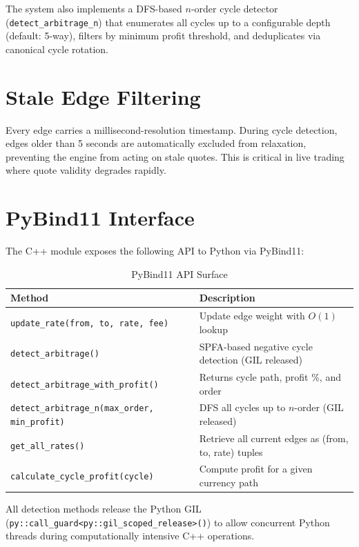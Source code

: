 \documentclass[letterpaper,11pt]{report}
\begin{document}
The system also implements a DFS-based $n$-order cycle detector (\texttt{detect\_arbitrage\_n}) that enumerates all cycles up to a configurable depth (default: 5-way), filters by minimum profit threshold, and deduplicates via canonical cycle rotation.

\section{Stale Edge Filtering}

Every edge carries a millisecond-resolution timestamp. During cycle detection, edges older than 5 seconds are automatically excluded from relaxation, preventing the engine from acting on stale quotes. This is critical in live trading where quote validity degrades rapidly.

\section{PyBind11 Interface}

The C++ module exposes the following API to Python via PyBind11:

\begin{table}[h]
\centering
\caption{PyBind11 API Surface}
\begin{tabular}{lp{7.5cm}}
\toprule
\textbf{Method} & \textbf{Description} \\
\midrule
\texttt{update\_rate(from, to, rate, fee)} & Update edge weight with $O(1)$ lookup \\
\texttt{detect\_arbitrage()} & SPFA-based negative cycle detection (GIL released) \\
\texttt{detect\_arbitrage\_with\_profit()} & Returns cycle path, profit \%, and order \\
\texttt{detect\_arbitrage\_n(max\_order, min\_profit)} & DFS all cycles up to $n$-order (GIL released) \\
\texttt{get\_all\_rates()} & Retrieve all current edges as (from, to, rate) tuples \\
\texttt{calculate\_cycle\_profit(cycle)} & Compute profit for a given currency path \\
\bottomrule
\end{tabular}
\end{table}

All detection methods release the Python GIL (\texttt{py::call\_guard<py::gil\_scoped\_release>()}) to allow concurrent Python threads during computationally intensive C++ operations.
\end{document}
